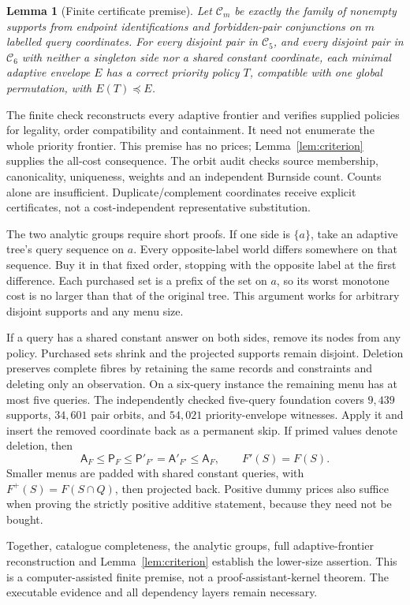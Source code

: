 \documentclass[pdflatex,sn-mathphys-num]{sn-jnl}
\newcommand{\A}{\mathsf{A}}
\newcommand{\Pcost}{\mathsf{P}}
\theoremstyle{thmstyleone}
\newtheorem{lemma}[theorem]{Lemma}
\theoremstyle{thmstylethree}
\theoremstyle{thmstyletwo}
\begin{document}
\begin{lemma}[Finite certificate premise]\label{lem:finite}
Let $\mathcal C_m$ be exactly the family of nonempty supports from endpoint identifications and forbidden-pair conjunctions on $m$ labelled query coordinates. For every disjoint pair in $\mathcal C_5$, and every disjoint pair in $\mathcal C_6$ with neither a singleton side nor a shared constant coordinate, each minimal adaptive envelope $E$ has a correct priority policy $T$, compatible with one global permutation, with $E(T)\preceq E$.
\end{lemma}
The finite check reconstructs every adaptive frontier and verifies supplied policies for legality, order compatibility and containment. It need not enumerate the whole priority frontier. This premise has no prices; Lemma~\ref{lem:criterion} supplies the all-cost consequence. The orbit audit checks source membership, canonicality, uniqueness, weights and an independent Burnside count. Counts alone are insufficient. Duplicate/complement coordinates receive explicit certificates, not a cost-independent representative substitution.

The two analytic groups require short proofs. If one side is $\{a\}$, take an adaptive tree's query sequence on $a$. Every opposite-label world differs somewhere on that sequence. Buy it in that fixed order, stopping with the opposite label at the first difference. Each purchased set is a prefix of the set on $a$, so its worst monotone cost is no larger than that of the original tree. This argument works for arbitrary disjoint supports and any menu size.

If a query has a shared constant answer on both sides, remove its nodes from any policy. Purchased sets shrink and the projected supports remain disjoint. Deletion preserves complete fibres by retaining the same records and constraints and deleting only an observation. On a six-query instance the remaining menu has at most five queries. The independently checked five-query foundation covers $9,439$ supports, $34,601$ pair orbits, and $54,021$ priority-envelope witnesses. Apply it and insert the removed coordinate back as a permanent skip. If primed values denote deletion, then
\[
 \A_F\leq\Pcost_F\leq\Pcost'_{F'}=\A'_{F'}\leq\A_F,
 \qquad F'(S)=F(S).
\]
Smaller menus are padded with shared constant queries, with $F^+(S)=F(S\cap Q)$, then projected back. Positive dummy prices also suffice when proving the strictly positive additive statement, because they need not be bought.

Together, catalogue completeness, the analytic groups, full adaptive-frontier reconstruction and Lemma~\ref{lem:criterion} establish the lower-size assertion. This is a computer-assisted finite premise, not a proof-assistant-kernel theorem. The executable evidence and all dependency layers remain necessary.
\end{document}
